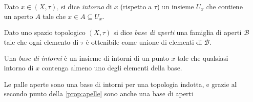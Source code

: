



\begin{defn}[Intorno]
	Dato $x \in (X,\tau)$,
	si dice \emph{intorno} di $x$ (rispetto a $\tau$)
	un insieme $U_x$ che contiene un aperto $A$ tale che $x \in A \subseteq U_x$.
\end{defn}

\begin{defn}
	Dato uno spazio topologico $(X,\tau)$
	si dice \emph{base di aperti} una famiglia di aperti $\mathcal B$
	tale che ogni elemento di $\tau$ è ottenibile come unione di elementi di $\mathcal B$.
\end{defn}

\begin{defn}
	Una \emph{base di intorni} è un insieme di intorni di un punto $x$
	tale che qualsiasi intorno di $x$ contenga almeno uno degli elementi della base.
\end{defn}

\begin{oss}
	Le palle aperte sono una base di intorni per una topologia indotta, e grazie al secondo punto della \autoref{prop:apelle} sono anche una base di aperti
\end{oss}
